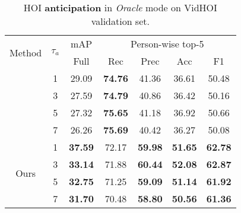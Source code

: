 \documentclass[times,twocolumn,final,authoryear]{elsarticle}
\begin{document}
\begin{table}
    \centering
    \begin{subtable}[]{0.47\textwidth}
        \centering
        \small
        \begin{tabular}{|c|c|c|c c c c|}
            \hline
            \multirow{2}{*}{Method} & \multirow{2}{*}{$\tau_a$} & mAP & \multicolumn{4}{c|}{Person-wise top-5} \\
            \cline{3-7}
            & & Full & Rec & Prec & Acc & F1 \\
            \hhline{|=|=|=|= = = =|}
            \multirow{4}{*}{STTran} & 1 & 29.09 & \textbf{74.76} & 41.36 & 36.61 & 50.48\\
            & 3 & 27.59 & \textbf{74.79} & 40.86 & 36.42 & 50.16\\
            & 5 & 27.32 & \textbf{75.65} & 41.18 & 36.92 & 50.66\\
            & 7 & 26.26 & \textbf{75.69} & 40.42 & 36.27 & 50.08\\
            \hline
            \multirow{4}{*}{Ours} & 1 & \textbf{37.59} & 72.17 & \textbf{59.98} & \textbf{51.65} & \textbf{62.78}\\
            & 3 & \textbf{33.14} & 71.88 & \textbf{60.44} & \textbf{52.08} & \textbf{62.87}\\
            & 5 & \textbf{32.75} & 71.25 & \textbf{59.09} & \textbf{51.14} & \textbf{61.92}\\
            & 7 & \textbf{31.70} & 70.48 & \textbf{58.80} & \textbf{50.56} & \textbf{61.36}\\
            \hline
        \end{tabular}
        \caption{HOI \textbf{anticipation} in \emph{Oracle} mode on VidHOI validation set.}
        \label{table:anticipation_oracle}
    \end{subtable}


\end{table}
\end{document}
